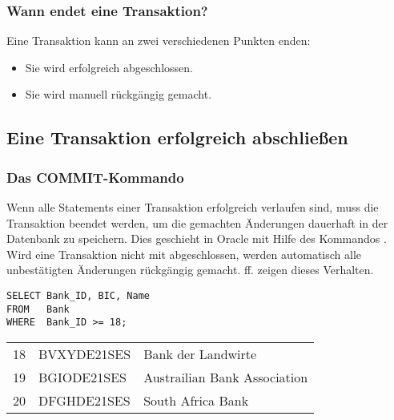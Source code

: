         \subsubsection{Wann endet eine Transaktion?}
          Eine Transaktion kann an zwei verschiedenen Punkten enden:
          \begin{itemize}
            \item Sie wird erfolgreich abgeschlossen.
            \item Sie wird manuell rückgängig gemacht.
          \end{itemize}
      \subsection{Eine Transaktion erfolgreich abschließen}
        \subsubsection{Das COMMIT-Kommando}
          Wenn alle Statements einer Transaktion erfolgreich verlaufen sind, muss
          die Transaktion beendet werden, um die gemachten Änderungen dauerhaft
          in der Datenbank zu speichern. Dies geschieht in Oracle mit Hilfe des
          Kommandos \COMMIT. Wird eine Transaktion nicht mit \COMMIT{} abgeschlossen, werden
          automatisch alle unbestätigten Änderungen rückgängig gemacht.
           ff. zeigen dieses Verhalten.
          \begin{lstlisting}[language=oracle_sql,caption={Eine Transaktion wird abgebrochen},label=sql07_23]
SELECT Bank_ID, BIC, Name
FROM   Bank
WHERE  Bank_ID >= 18;
          \end{lstlisting}
          \begin{center}
            \begin{small}
              \tablehead{}
              \begin{msoraclesql}
                \begin{supertabular}{rll}
                  18 & BVXYDE21SES & Bank der Landwirte \\
                  19 & BGIODE21SES & Austrailian Bank Association \\
                  20 & DFGHDE21SES & South Africa Bank \\
                \end{supertabular}
              \end{msoraclesql}
            \end{small}
          \end{center}
